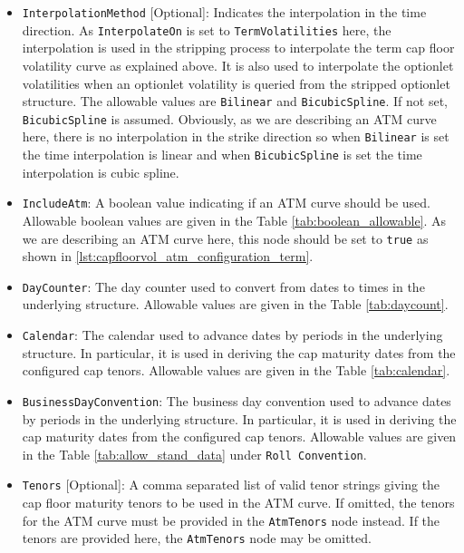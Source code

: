 \begin{itemize}
\item \lstinline!InterpolationMethod! [Optional]:
Indicates the interpolation in the time direction. As \lstinline!InterpolateOn! is set to \lstinline!TermVolatilities! here, the interpolation is used in the stripping process to interpolate the term cap floor volatility curve as explained above. It is also used to interpolate the optionlet volatilities when an optionlet volatility is queried from the stripped optionlet structure. The allowable values are \lstinline!Bilinear! and \lstinline!BicubicSpline!. If not set, \lstinline!BicubicSpline! is assumed. Obviously, as we are describing an ATM curve here, there is no interpolation in the strike direction so when \lstinline!Bilinear! is set the time interpolation is linear and when \lstinline!BicubicSpline! is set the time interpolation is cubic spline.

\item \lstinline!IncludeAtm!:
A boolean value indicating if an ATM curve should be used. Allowable boolean values are given in the Table \ref{tab:boolean_allowable}. As we are describing an ATM curve here, this node should be set to \lstinline!true! as shown in \ref{lst:capfloorvol_atm_configuration_term}.

\item \lstinline!DayCounter!:
The day counter used to convert from dates to times in the underlying structure. Allowable values are given in the Table \ref{tab:daycount}.

\item \lstinline!Calendar!:
The calendar used to advance dates by periods in the underlying structure. In particular, it is used in deriving the cap maturity dates from the configured cap tenors. Allowable values are given in the Table \ref{tab:calendar}.

\item \lstinline!BusinessDayConvention!:
The business day convention used to advance dates by periods in the underlying structure. In particular, it is used in deriving the cap maturity dates from the configured cap tenors. Allowable values are given in the Table \ref{tab:allow_stand_data} under \lstinline!Roll Convention!.

\item \lstinline!Tenors! [Optional]:
A comma separated list of valid tenor strings giving the cap floor maturity tenors to be used in the ATM curve. If omitted, the tenors for the ATM curve must be provided in the \lstinline!AtmTenors! node instead. If the tenors are provided here, the \lstinline!AtmTenors! node may be omitted.


\end{itemize}
